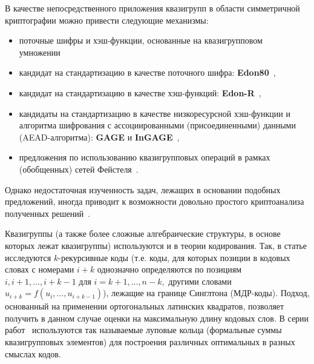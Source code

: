     В качестве непосредственного приложения квазигрупп в области симметричной криптографии можно привести следующие механизмы:
    \begin{itemize}
        \item поточные шифры и хэш-функции, основанные на квазигрупповом умножении~\cite{markovski1999quasigroup, markovski2003quasigroup, markovski2017quasigroup, snavsel2009hash}
        \item кандидат на стандартизацию в качестве поточного шифра: \textbf{Edon80}~\cite{edon80},
        \item кандидат на стандартизацию в качестве хэш-функций: \textbf{Edon-R}~\cite{EdonR, EdonRprime},
        \item кандидаты на стандартизацию в качестве низкоресурсной хэш-функции и алгоритма шифрования с ассоциированными (присоединенными) данными (AEAD-алгоритма): \textbf{GAGE} и \textbf{InGAGE}~\cite{otte2019gage, gligoroski2019s},
        \item предложения по использованию квазигрупповых операций в рамках (обобщенных) сетей Фейстеля~\cite{tecseleanu2021quasigroups, tecseleanu2022security, tecseleanu2023cryptographic, cherednik17, cherednik19, cherednik20}.
    \end{itemize}
    Однако недостаточная изученность задач, лежащих в основании подобных предложений, иногда приводит к возможности довольно простого криптоанализа полученных решений~\cite{vojvoda2004cryptanalysis, slaminkova2010cryptanalysis, hell2007key, vojvoda2007note}.

    Квазигруппы (а также более сложные алгебраические структуры, в основе которых лежат квазигруппы) используются и в теории кодирования.
    Так, в статье \cite{nechaev98} исследуются $k$-рекурсивные коды (т.е. коды, для которых позиции в кодовых словах с номерами $i+k$ однозначно определяются по позициям $i, i+1, \ldots, i+k-1$ для $i = k+1, \ldots, n-k,$ другими словами $u_{i+k} = f(u_i, \ldots, u_{i+k-1})$), лежащие на границе Синглтона (МДР-коды).
    Подход, основанный на применении ортогональных латинских квадратов, позволяет получить в данном случае оценки на максимальную длину кодовых слов.
    В серии работ~\cite{nechaev04, couselo2004loop, markov12, markov2020nonassociative} используются так называемые луповые кольца (формальные суммы квазигрупповых элементов) для построения различных оптимальных в разных смыслах кодов.

